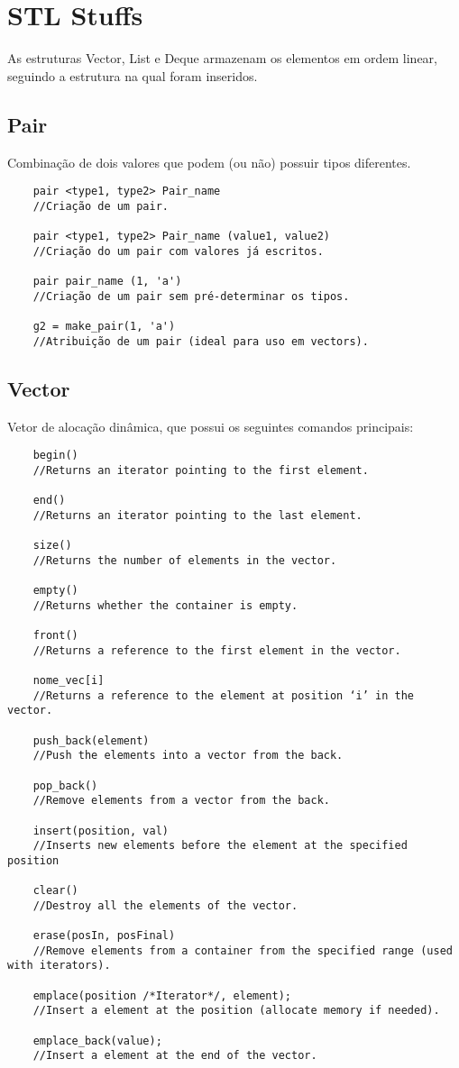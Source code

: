 \section{STL Stuffs}
As estruturas Vector, List e Deque armazenam os elementos em ordem linear,
seguindo a estrutura na qual foram inseridos.

\subsection{Pair}
Combinação de dois valores que podem (ou não) possuir tipos diferentes.
\begin{verbatim}
    pair <type1, type2> Pair_name 
    //Criação de um pair.

    pair <type1, type2> Pair_name (value1, value2) 
    //Criação do um pair com valores já escritos.

    pair pair_name (1, 'a') 
    //Criação de um pair sem pré-determinar os tipos.

    g2 = make_pair(1, 'a') 
    //Atribuição de um pair (ideal para uso em vectors).
\end{verbatim}

\subsection{Vector}
Vetor de alocação dinâmica, que possui os seguintes comandos principais:
\begin{verbatim}
    begin()
    //Returns an iterator pointing to the first element.

    end() 
    //Returns an iterator pointing to the last element.

    size() 
    //Returns the number of elements in the vector.

    empty() 
    //Returns whether the container is empty.

    front() 
    //Returns a reference to the first element in the vector.

    nome_vec[i] 
    //Returns a reference to the element at position ‘i’ in the vector.

    push_back(element) 
    //Push the elements into a vector from the back.

    pop_back() 
    //Remove elements from a vector from the back.

    insert(position, val) 
    //Inserts new elements before the element at the specified position

    clear() 
    //Destroy all the elements of the vector.

    erase(posIn, posFinal) 
    //Remove elements from a container from the specified range (used with iterators).

    emplace(position /*Iterator*/, element); 
    //Insert a element at the position (allocate memory if needed).

    emplace_back(value); 
    //Insert a element at the end of the vector.
\end{verbatim}

